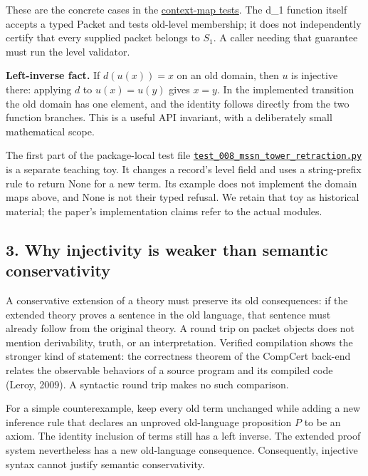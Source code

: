 \documentclass[
  11pt,
]{article}
\begin{document}
These are the concrete cases in the
\href{https://github.com/dbccpage/the_symbol_game/blob/52cb5457f6c485ba548cfd292f6012a941ed22cf/research/mssn_sn_tower/code/python/tests/test_mssn_updown_and_cells.py}{context-map
tests}. The d\_1 function itself accepts a typed Packet and tests
old-level membership; it does not independently certify that every
supplied packet belongs to \(S_1\). A caller needing that guarantee must
run the level validator.

\textbf{Left-inverse fact.} If \(d(u(x))=x\) on an old domain, then
\(u\) is injective there: applying \(d\) to \(u(x)=u(y)\) gives \(x=y\).
In the implemented transition the old domain has one element, and the
identity follows directly from the two function branches. This is a
useful API invariant, with a deliberately small mathematical scope.

The first part of the package-local test file
\href{../../008_pfp_mssn_tower_challenges_and_retraction_benchmarks/code/tests/test_008_mssn_tower_retraction.py}{\nolinkurl{test_008_mssn_tower_retraction.py}}
is a separate teaching toy. It changes a record's level field and uses a
string-prefix rule to return None for a new term. Its example does not
implement the domain maps above, and None is not their typed refusal. We
retain that toy as historical material; the paper's implementation
claims refer to the actual modules.

\hypertarget{why-injectivity-is-weaker-than-semantic-conservativity}{%
\subsection{3. Why injectivity is weaker than semantic
conservativity}\label{why-injectivity-is-weaker-than-semantic-conservativity}}

A conservative extension of a theory must preserve its old consequences:
if the extended theory proves a sentence in the old language, that
sentence must already follow from the original theory. A round trip on
packet objects does not mention derivability, truth, or an
interpretation. Verified compilation shows the stronger kind of
statement: the correctness theorem of the CompCert back-end relates the
observable behaviors of a source program and its compiled code (Leroy,
2009). A syntactic round trip makes no such comparison.

For a simple counterexample, keep every old term unchanged while adding
a new inference rule that declares an unproved old-language proposition
\(P\) to be an axiom. The identity inclusion of terms still has a left
inverse. The extended proof system nevertheless has a new old-language
consequence. Consequently, injective syntax cannot justify semantic
conservativity.
\end{document}

